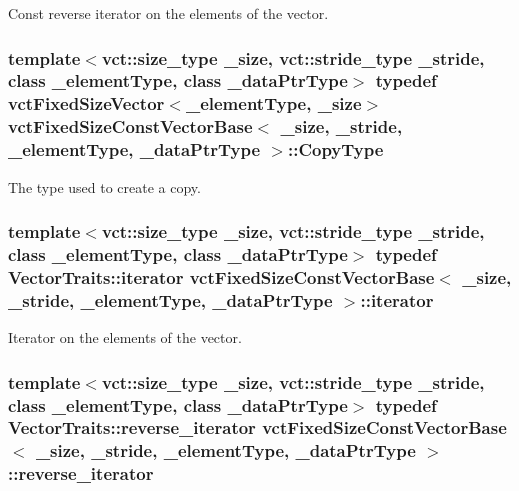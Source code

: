 Const reverse iterator on the elements of the vector. \hypertarget{classvct_fixed_size_const_vector_base_aaf3accb7cec5765478b5d8fa39c22408}{
\subsubsection[{Copy\-Type}]{\setlength{\rightskip}{0pt plus 5cm}template$<$vct\-::size\-\_\-type \-\_\-size, vct\-::stride\-\_\-type \-\_\-stride, class \-\_\-element\-Type, class \-\_\-data\-Ptr\-Type$>$ typedef {\bf vct\-Fixed\-Size\-Vector}$<$\-\_\-element\-Type, \-\_\-size$>$ {\bf vct\-Fixed\-Size\-Const\-Vector\-Base}$<$ \-\_\-size, \-\_\-stride, \-\_\-element\-Type, \-\_\-data\-Ptr\-Type $>$\-::{\bf Copy\-Type}}}\label{classvct_fixed_size_const_vector_base_aaf3accb7cec5765478b5d8fa39c22408}
The type used to create a copy. \hypertarget{classvct_fixed_size_const_vector_base_ad0ba9b13bb2515695b4e44290bdbaa5d}{
\subsubsection[{iterator}]{\setlength{\rightskip}{0pt plus 5cm}template$<$vct\-::size\-\_\-type \-\_\-size, vct\-::stride\-\_\-type \-\_\-stride, class \-\_\-element\-Type, class \-\_\-data\-Ptr\-Type$>$ typedef {\bf Vector\-Traits\-::iterator} {\bf vct\-Fixed\-Size\-Const\-Vector\-Base}$<$ \-\_\-size, \-\_\-stride, \-\_\-element\-Type, \-\_\-data\-Ptr\-Type $>$\-::{\bf iterator}}}\label{classvct_fixed_size_const_vector_base_ad0ba9b13bb2515695b4e44290bdbaa5d}
Iterator on the elements of the vector. \hypertarget{classvct_fixed_size_const_vector_base_ae22e8ced509e202d00620f384ac3a5b2}{
\subsubsection[{reverse\-\_\-iterator}]{\setlength{\rightskip}{0pt plus 5cm}template$<$vct\-::size\-\_\-type \-\_\-size, vct\-::stride\-\_\-type \-\_\-stride, class \-\_\-element\-Type, class \-\_\-data\-Ptr\-Type$>$ typedef {\bf Vector\-Traits\-::reverse\-\_\-iterator} {\bf vct\-Fixed\-Size\-Const\-Vector\-Base}$<$ \-\_\-size, \-\_\-stride, \-\_\-element\-Type, \-\_\-data\-Ptr\-Type $>$\-::{\bf reverse\-\_\-iterator}}}\label{classvct_fixed_size_const_vector_base_ae22e8ced509e202d00620f384ac3a5b2}
